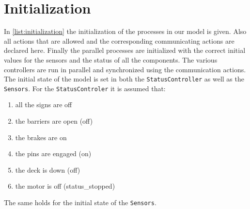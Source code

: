 	\section{Initialization}
		In \cref{list:initialization} the initialization of the processes in our model is given. Also all actions that are allowed and the corresponding communicating actions are declared here. Finally the parallel processes are initialized with the correct initial values for the sensors and the status of all the components.
		The various controllers are run in parallel and synchronized using the communication actions.
		The initial state of the model is set in both the \texttt{StatusController} as well as the \texttt{Sensors}.
		For the \texttt{StatusControler} it is assumed that:
		\begin{enumerate}
			\item all the signs are off
			\item the barriers are open (off)
			\item the brakes are on
			\item the pins are engaged (on)
			\item the deck is down (off)
			\item the motor is off (status\_stopped)
		\end{enumerate}
		The same holds for the initial state of the \texttt{Sensors}.
		
		